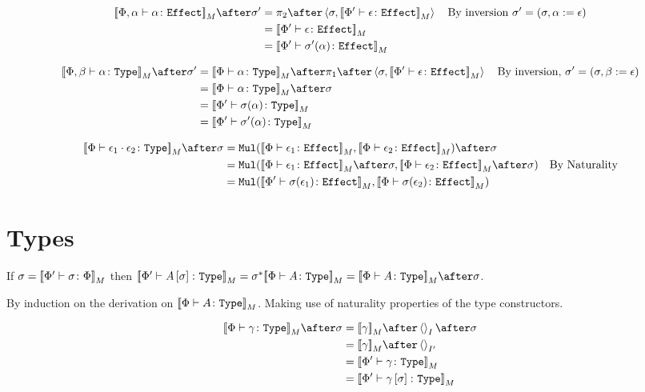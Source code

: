 \documentclass{report}
\newcommand\type[0]{\texttt{Type}}
\newcommand\effect[0]{\texttt{Effect}}
\newcommand\Mul[0]{\texttt{Mul}}
\renewcommand\star[0]{^*}
\begin{document}
\begin{align}
    \deno{\typerelation{\P,\a}{\a}{\effect}}\after\si' &= \pp\after\pr{\si}{\deno{\typerelation{\P'}{\e}{\effect}}}\qt{By inversion $\si' = (\si, \a\setto\e)$}\\
    & =\deno{\typerelation{\P'}{\e}{\effect}} \\
    &= \deno{\typerelation{\P'}{\si'(\a)}{\effect}}\\
\end{align}

\begin{align}
    \deno{\typerelation{\P, \b}{\a}{\type}}\after\si' &= \deno{\typerelation{\P}{\a}{\type}} \after \p\after\pr{\si}{\deno{\typerelation{\P'}{\e}{\effect}}}\qt{By inversion, $\si' = (\si, \b\setto\e)$}\\
    & = \deno{\typerelation{\P}{\a}{\type}}\after\si\\
    & = \deno{\typerelation{\P'}{\si(\a)}{\type}}\\
    & = \deno{\typerelation{\P'}{\si'(\a)}{\type}}\\
\end{align}

\begin{align}
    \deno{\typerelation{\P}{\e_1\dot\e_2}{\type}} \after\si &=
    \Mul(\deno{\typerelation{\P}{\e_1}{\effect}}, \deno{\typerelation{\P}{\e_2}{\effect}})\after \si \\
    & = \Mul(\deno{\typerelation{\P}{\e_1}{\effect}}\after \si, \deno{\typerelation{\P}{\e_2}{\effect}}\after \si)\qt{By Naturality}\\
    & = \Mul(\deno{\typerelation{\P'}{\si(\e_1)}{\effect}}, \deno{\typerelation{\P}{\si(\e_2)}{\effect}})\\
\end{align}

\section{Types}
If $\sigma = {\bf [\![}\Phi' \vdash \sigma \colon \Phi{\bf ]\!]}_M$ then $\deno{\typerelation{\P'}{A\ssi}{\type}} = \si\star\deno{\typerelation{\P}{A}{\type}} = \deno{\typerelation{\P}{A}{\type}}\after\si$.

\proof
By induction on the derivation on $\deno{\typerelation{\P}{A}{\type}}$. Making use of naturality properties of the type constructors.

\begin{align}
    \deno{\typerelation{\P}{\g}{\type}}\after\si &= \deno{\g}\after\term{I}\after\si\\
    & =  \deno{\g}\after\term{I'}\\
    & = \deno{\typerelation{\P'}{\g}{\type}}\\
    & = \deno{\typerelation{\P'}{\g\ssi}{\type}}
\end{align}
\end{document}
